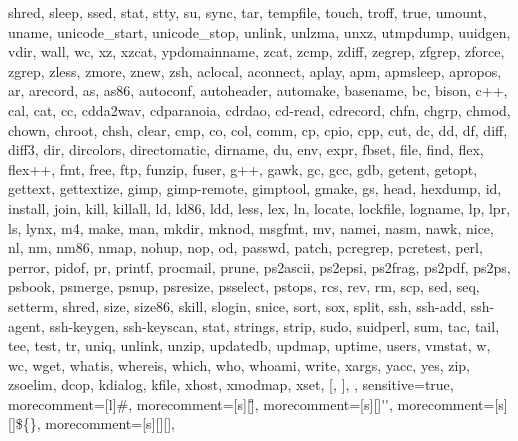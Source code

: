 {{	  shred,
	  sleep,
	  ssed,
	  stat,
	  stty,
	  su,
	  sync,
	  tar,
	  tempfile,
	  touch,
	  troff,
	  true,
	  umount,
	  uname,
	  unicode_start,
	  unicode_stop,
	  unlink,
	  unlzma,
	  unxz,
	  utmpdump,
	  uuidgen,
	  vdir,
	  wall,
	  wc,
	  xz,
	  xzcat,
	  ypdomainname,
	  zcat,
	  zcmp,
	  zdiff,
	  zegrep,
	  zfgrep,
	  zforce,
	  zgrep,
	  zless,
	  zmore,
	  znew,
	  zsh,
	  aclocal,
	  aconnect,
	  aplay,
	  apm,
	  apmsleep,
	  apropos,
	  ar,
	  arecord,
	  as,
	  as86,
	  autoconf,
	  autoheader,
	  automake,
	  basename,
	  bc,
	  bison,
	  c++,
	  cal,
	  cat,
	  cc,
	  cdda2wav,
	  cdparanoia,
	  cdrdao,
	  cd-read,
	  cdrecord,
	  chfn,
	  chgrp,
	  chmod,
	  chown,
	  chroot,
	  chsh,
	  clear,
	  cmp,
	  co,
	  col,
	  comm,
	  cp,
	  cpio,
	  cpp,
	  cut,
	  dc,
	  dd,
	  df,
	  diff,
	  diff3,
	  dir,
	  dircolors,
	  directomatic,
	  dirname,
	  du,
	  env,
	  expr,
	  fbset,
	  file,
	  find,
	  flex,
	  flex++,
	  fmt,
	  free,
	  ftp,
	  funzip,
	  fuser,
	  g++,
	  gawk,
	  gc,
	  gcc,
	  gdb,
	  getent,
	  getopt,
	  gettext,
	  gettextize,
	  gimp,
	  gimp-remote,
	  gimptool,
	  gmake,
	  gs,
	  head,
	  hexdump,
	  id,
	  install,
	  join,
	  kill,
	  killall,
	  ld,
	  ld86,
	  ldd,
	  less,
	  lex,
	  ln,
	  locate,
	  lockfile,
	  logname,
	  lp,
	  lpr,
	  ls,
	  lynx,
	  m4,
	  make,
	  man,
	  mkdir,
	  mknod,
	  msgfmt,
	  mv,
	  namei,
	  nasm,
	  nawk,
	  nice,
	  nl,
	  nm,
	  nm86,
	  nmap,
	  nohup,
	  nop,
	  od,
	  passwd,
	  patch,
	  pcregrep,
	  pcretest,
	  perl,
	  perror,
	  pidof,
	  pr,
	  printf,
	  procmail,
	  prune,
	  ps2ascii,
	  ps2epsi,
	  ps2frag,
	  ps2pdf,
	  ps2ps,
	  psbook,
	  psmerge,
	  psnup,
	  psresize,
	  psselect,
	  pstops,
	  rcs,
	  rev,
	  rm,
	  scp,
	  sed,
	  seq,
	  setterm,
	  shred,
	  size,
	  size86,
	  skill,
	  slogin,
	  snice,
	  sort,
	  sox,
	  split,
	  ssh,
	  ssh-add,
	  ssh-agent,
	  ssh-keygen,
	  ssh-keyscan, 
	  stat,
	  strings,
	  strip,
	  sudo,
	  suidperl,
	  sum,
	  tac,
	  tail,
	  tee,
	  test,
	  tr,
	  uniq,
	  unlink,
	  unzip,
	  updatedb,
	  updmap,
	  uptime,
	  users,
	  vmstat,
	  w,
	  wc,
	  wget,
	  whatis,
	  whereis,
	  which,
	  who,
	  whoami,
	  write,
	  xargs,
	  yacc,
	  yes,
	  zip,
	  zsoelim,
	  dcop,
	  kdialog,
	  kfile,
	  xhost,
	  xmodmap,
	  xset,
	  [,
	  ],
},
sensitive=true,
morecomment=[l]{\#},
morecomment=[s][\color{red}]{\"}{\"},
morecomment=[s][\color{red}]{\'}{\'},
morecomment=[s][\color{bash_keyword1}]{\$\{}{\}},
morecomment=[s][\color{bash_builtins}]{[}{]},
}


